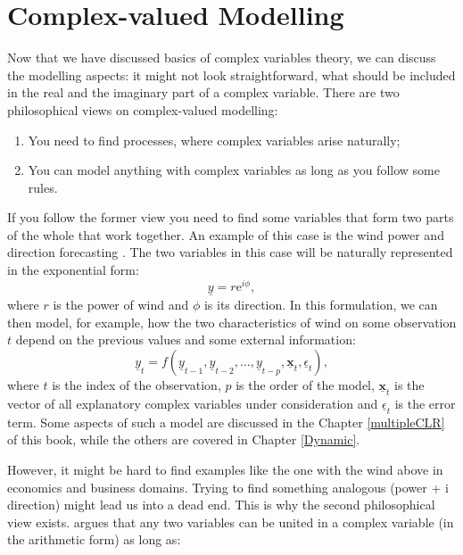 \documentclass[
]{book}
\providecommand{\tightlist}{%
  \setlength{\itemsep}{0pt}\setlength{\parskip}{0pt}}
\begin{document}
\hypertarget{complexModelling}{%
\section{Complex-valued Modelling}\label{complexModelling}}

Now that we have discussed basics of complex variables theory, we can discuss the modelling aspects: it might not look straightforward, what should be included in the real and the imaginary part of a complex variable. There are two philosophical views on complex-valued modelling:

\begin{enumerate}
\def\labelenumi{\arabic{enumi}.}
\tightlist
\item
  You need to find processes, where complex variables arise naturally;
\item
  You can model anything with complex variables as long as you follow some rules.
\end{enumerate}

If you follow the former view you need to find some variables that form two parts of the whole that work together. An example of this case is the wind power and direction forecasting \citep{Goh2004, Javidi2008, Knight2019}. The two variables in this case will be naturally represented in the exponential form:
\begin{equation*}
    \underline{y} = r \mathrm{e}^{i \phi} ,
\end{equation*}
where \(r\) is the power of wind and \(\phi\) is its direction. In this formulation, we can then model, for example, how the two characteristics of wind on some observation \(t\) depend on the previous values and some external information:
\begin{equation*}
    \underline{y}_t = f(\underline{y}_{t-1}, \underline{y}_{t-2}, \dots, \underline{y}_{t-p}, \underline{\mathbf{x}}_t, \underline{\epsilon}_t),
\end{equation*}
where \(t\) is the index of the observation, \(p\) is the order of the model, \(\underline{\mathbf{x}}_t\) is the vector of all explanatory complex variables under consideration and \(\underline{\epsilon}_t\) is the error term. Some aspects of such a model are discussed in the Chapter \ref{multipleCLR} of this book, while the others are covered in Chapter \ref{Dynamic}.

However, it might be hard to find examples like the one with the wind above in economics and business domains. Trying to find something analogous (power + i direction) might lead us into a dead end. This is why the second philosophical view exists. \citet{Svetunkov2012} argues that any two variables can be united in a complex variable (in the arithmetic form) as long as:
\end{document}
